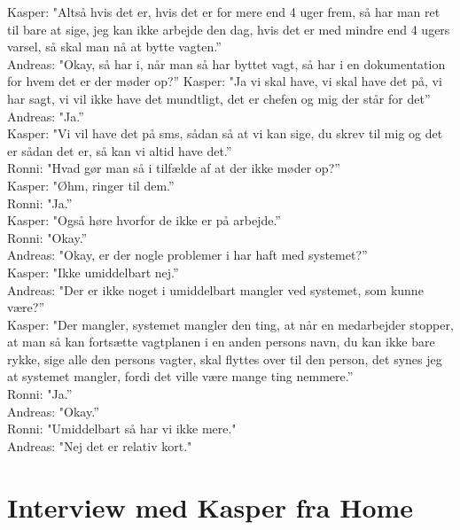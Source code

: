 Kasper: "Altså hvis det er, hvis det er for mere end 4 uger frem, så har man ret til bare at sige, jeg kan ikke arbejde den dag, hvis det er med mindre end 4 ugers varsel, så skal man nå at bytte vagten.”\\
Andreas: "Okay, så har i, når man så har byttet vagt, så har i en dokumentation for hvem det er der møder op?”
Kasper: "Ja vi skal have, vi skal have det på, vi har sagt, vi vil ikke have det mundtligt, det er chefen og mig der står for det”\\
Andreas: "Ja.”\\
Kasper: "Vi vil have det på sms, sådan så at vi kan sige, du skrev til mig og det er sådan det er, så kan vi altid have det.”\\
Ronni: "Hvad gør man så i tilfælde af at der ikke møder op?”\\
Kasper: "Øhm, ringer til dem.”\\
Ronni: "Ja.”\\
Kasper: "Også høre hvorfor de ikke er på arbejde.”\\
Ronni: "Okay.”\\
Andreas: "Okay, er der nogle problemer i har haft med systemet?”\\
Kasper: "Ikke umiddelbart nej.”\\
Andreas: "Der er ikke noget i umiddelbart mangler ved systemet, som kunne være?”\\
Kasper: "Der mangler, systemet mangler den ting, at når en medarbejder stopper, at man så kan fortsætte vagtplanen i en anden persons navn, du kan ikke bare rykke, sige alle den persons vagter, skal flyttes over til den person, det synes jeg at systemet mangler, fordi det ville være mange ting nemmere.”\\
Ronni: "Ja.”\\
Andreas: "Okay.”\\
Ronni: "Umiddelbart så har vi ikke mere."\\
Andreas: "Nej det er relativ kort."\\
\section{Interview med Kasper fra Home}\label{app:home}

